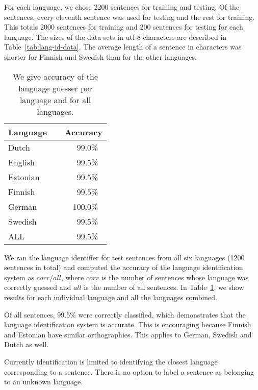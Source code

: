 \documentclass{llncs}
\begin{document}
For each language, we chose 2200 sentences for training and
testing. Of the sentences, every eleventh sentence was used for
testing and the rest for training. This totals 2000 sentences for
training and 200 sentences for testing for each language. The sizes of
the data sets in utf-8 characters are described in
Table~\ref{tab:lang-id-data}. The average length of a sentence in
characters was shorter for Finnish and Swedish than for the other
languages.

\begin{table}
\small
\begin{center}
\caption{We give accuracy of the language guesser per language and for all languages.}\label{tab:lang-id-acc}
\begin{tabular}{ll}
Language~~ & Accuracy\\
\hline
Dutch    & ~~~99.0\%\\
English  & ~~~99.5\%\\
Estonian & ~~~99.5\%\\
Finnish  & ~~~99.5\%\\
German   & ~~100.0\%\\
Swedish  & ~~~99.5\%\\
\hline
ALL      & ~~~99.5\%\\
\hline
\end{tabular}
\end{center}
\end{table}

We ran the language identifier for test sentences from all six
languages (1200 sentences in total) and computed the accuracy of the
language identification system as $corr / all$, where $corr$ is
the number of sentences whose language was correctly guessed and $all$
is the number of all sentences. In Table~\ref{tab:lang-id-acc}, we
show results for each individual language and all the languages
combined. 

Of all sentences, 99.5\% were correctly classified, which demonstrates
that the language identification system is accurate. This is
encouraging because Finnish and Estonian have similar
orthographies. This applies to German, Swedish and Dutch as well.

Currently identification is limited to identifying the closest
language corresponding to a sentence. There is no option to label a
sentence as belonging to an unknown language. 

\end{document}
